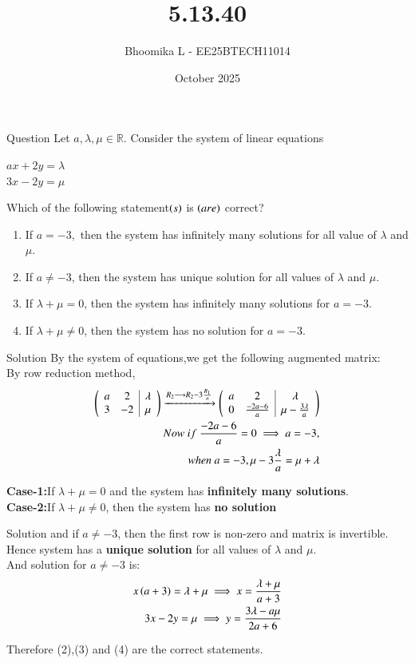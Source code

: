 \documentclass{beamer}
\title %
{5.13.40}
\date{October  2025}
\author %
{Bhoomika L - EE25BTECH11014}
\begin{document}
\frame{\titlepage}
\begin{frame}{Question} Let $a,\lambda,\mu \in \mathbb{R}$. Consider the system of linear equations\\
\begin{center}
$ax+2y=\lambda$\\
$3x-2y=\mu$
\end{center}
Which of the following statement$\left(s\right)$ is $\left(are\right)$ correct?
\begin{enumerate}
\item If $a=-3,$ then the system has infinitely many solutions for all value of $\lambda$ and $\mu$.
 \item If $a \neq -3$, then the system has unique solution for all values of $\lambda$ and $\mu.$
 \item  If $\lambda + \mu = 0$, then the system has infinitely many solutions for $a = -3$.
\item  If $\lambda + \mu \neq 0$, then the system has no solution for $a = -3$.
\end{enumerate}
\end{frame}

\begin{frame}{Solution}
By the system of equations,we get the following augmented matrix:\\
By row reduction method,
\begin{align} 
\begin{pmatrix}\begin{array}{cc|c}
a & 2 & \lambda \\
3 & -2 & \mu
\end{array}\end{pmatrix} \xrightarrow{R_2\longrightarrow R_2-3\frac{R_1}{a}}\begin{pmatrix}\begin{array}{cc|c}
a & 2 & \lambda \\
0 & \frac{-2a-6}{a} & \mu-\frac{3\lambda}{a}
\end{array}\end{pmatrix} \\
Now \ if \ \frac{-2a-6}{a}=0 \implies a=-3,\\
when \ a=-3,\mu-3\frac{\lambda}{a}=\mu+\lambda
\end{align}

\textbf{Case-1:}If $\lambda+\mu=0$ and the system has \textbf{infinitely many solutions}.\\
\textbf{Case-2:}If $\lambda+\mu\neq0$, then the system has \textbf{no solution}\\

\end{frame}

\begin{frame}{Solution}
and if $a\neq-3$, then the first row is non-zero and matrix is invertible. Hence system has a \textbf{unique solution} for all values of $\lambda$ and $\mu$. \\

And solution for $a\neq-3$ is:
\begin{align}
   x\left(a+3\right)=\lambda+\mu \implies x=\frac{\lambda+\mu}{a+3}\\
   3x-2y=\mu \implies y=\frac{3\lambda-a\mu}{2a+6}
 \end{align}

Therefore (2),(3) and (4) are the correct statements.    
\end{frame}
\end{document}
